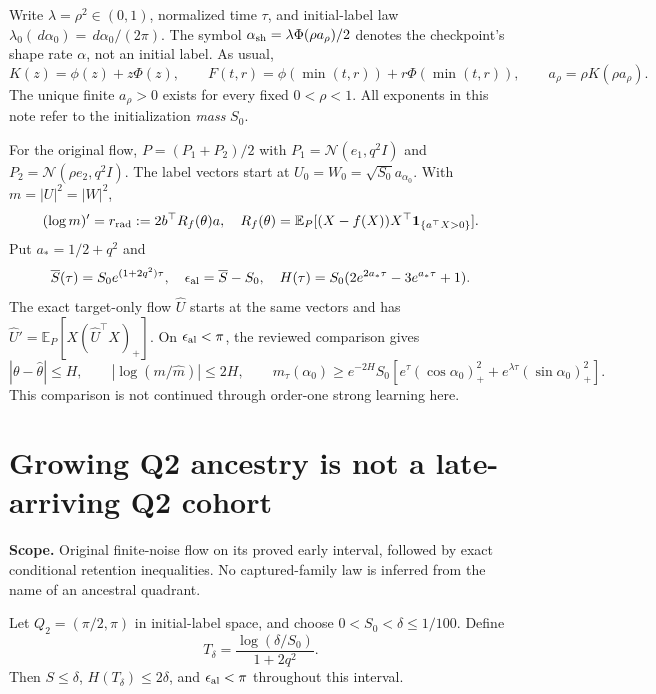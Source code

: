 \documentclass[11pt]{article}
\numberwithin{equation}{section}
\theoremstyle{remark}\newtheorem{remark}[theorem]{Remark}
\newcommand{\E}{\mathbb E}
\newcommand{\dd}{\,d}
\newcommand{\1}{\mathbf 1}
\newcommand{\scope}[1]{\par\noindent\textbf{Scope.} #1\par\smallskip}
\begin{document}
Write $\lambda=\rho^2\in(0,1)$, normalized time $\tau$, and initial-label
law $\lambda_0(\dd\alpha_0)=\dd\alpha_0/(2\pi)$. The symbol
$\alpha_{\rm sh}=\lambda\Phi(\rho a_\rho)/2$ denotes the checkpoint's
shape rate $\alpha$, not an initial label. As usual,
\[
 K(z)=\phi(z)+z\Phi(z),\qquad
 F(t,r)=\phi(\min(t,r))+r\Phi(\min(t,r)),\qquad
 a_\rho=\rho K(\rho a_\rho).
\]
The unique finite $a_\rho>0$ exists for every fixed $0<\rho<1$.
All exponents in this note refer to the initialization \emph{mass} $S_0$.

For the original flow, $P=(P_1+P_2)/2$ with
$P_1=\mathcal N(e_1,q^2I)$ and $P_2=\mathcal N(\rho e_2,q^2I)$.
The label vectors start at
$U_0=W_0=\sqrt{S_0}a_{\alpha_0}$. With $m=|U|^2=|W|^2$,
\[
 (\log m)'=r_{\rm rad}:=2b^\top R_f(\theta)a,
 \quad R_f(\theta)=\E_P[(X-f(X))X^\top\1_{\{a^\top X>0\}}].
\]
Put $a_*=1/2+q^2$ and
\[
 \overline S(\tau)=S_0e^{(1+2q^2)\tau},\quad
 \epsilon_{\rm al}=\overline S-S_0,\quad
 H(\tau)=S_0(2e^{2a_*\tau}-3e^{a_*\tau}+1).
\]
The exact target-only flow $\widehat U$ starts at the same vectors and has
$\widehat U'=\E_P[X(\widehat U^\top X)_+]$.
On $\epsilon_{\rm al}<\pi$, the reviewed comparison gives
\begin{equation}\label{inc:AN03:ret:v2:earlycomparison}
 |\theta-\widehat\theta|\le H,
 \qquad |\log(m/\widehat m)|\le2H,
 \qquad
 m_\tau(\alpha_0)\ge e^{-2H}S_0
 [e^\tau(\cos\alpha_0)_+^2+e^{\lambda\tau}(\sin\alpha_0)_+^2].
\end{equation}
This comparison is not continued through order-one strong learning here.

\section{Growing Q2 ancestry is not a late-arriving Q2 cohort}
\label{inc:AN03:ret:v2:ancestry}
\scope{Original finite-noise flow on its proved early interval, followed
by exact conditional retention inequalities. No captured-family law is
inferred from the name of an ancestral quadrant.}
Let $Q_2=(\pi/2,\pi)$ in initial-label space, and choose
$0<S_0<\delta\le1/100$. Define
\[
 T_\delta=\frac{\log(\delta/S_0)}{1+2q^2}.
\]
Then $S\le\delta$, $H(T_\delta)\le2\delta$, and
$\epsilon_{\rm al}<\pi$ throughout this interval.
\end{document}
